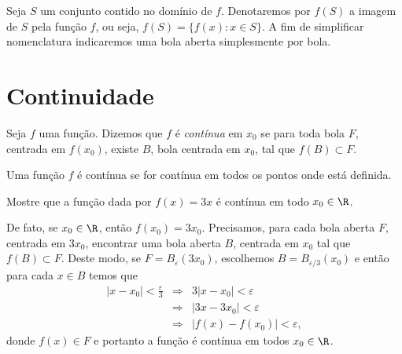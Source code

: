 \documentclass[11pt, oneside, a4paper]{gsm-l}
\begin{document}
Seja $S$ um conjunto contido no domínio de $f$. Denotaremos por $f(S)$ a
imagem de $S$ pela função $f$, ou seja, $f(S)=\big\{f(x): x\in
S\big\}$. A fim de simplificar nomenclatura indicaremos uma bola aberta
simplesmente por bola.

\section{Continuidade}\label{revcalc:cont}
\begin{defi}
  Seja $f$ uma função. Dizemos que $f$ é
  \emph{contínua} em $x_0$ se para toda bola $F$,
  centrada em $f(x_0)$, existe $B$, bola centrada em $x_0$, tal que
  $f(B)\subset F$.
\end{defi}

\begin{figure}[!h]
  \centering
\end{figure}

\begin{defi}
  Uma função $f$ é contínua se for contínua em todos os pontos onde está
  definida.
\end{defi}

\begin{exem}
  Mostre que a função dada por $f(x) = 3x$ é contínua em todo
  $x_0\in\R$.

  De fato, se $x_0\in\R$, então $f(x_0)=3x_0$. Precisamos, para cada
  bola aberta $F$, centrada em $3x_0$, encontrar uma bola aberta $B$,
  centrada em $x_0$ tal que $f(B)\subset F$. Deste modo, se
  $F=B_\varepsilon(3x_0)$, escolhemos $B=B_{\varepsilon\slash 3}(x_0)$ e
  então para cada $x\in B$ temos que
  \begin{eqnarray*}
    |x-x_0|<\frac{\varepsilon}{3}&\Rightarrow&3|x-x_0|<\varepsilon\\
    &\Rightarrow&|3x-3x_0|<\varepsilon\\
    &\Rightarrow&|f(x)-f(x_0)|<\varepsilon,
  \end{eqnarray*}
  donde $f(x)\in F$ e portanto a função é contínua em todos $x_0\in\R$.
\end{exem}
\end{document}

